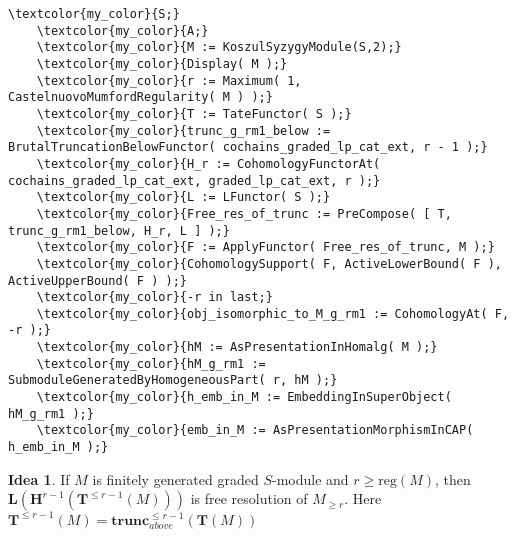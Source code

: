 \documentclass[16pt,a4paper]{extarticle}
\theoremstyle{definition}
\newtheorem{idea}{Idea}
\theoremstyle{theorem}
\newcommand{\LL}{\mathbf{L}}
\newcommand{\HH}{\mathbf{H}}
\newcommand{\TT}{\mathbf{T}}
\newcommand{\trunc}{\mathbf{trunc}}
\begin{document}
\begin{Verbatim}[commandchars=\\\{\}, fontseries=b, frame=single, label=Gap Code, framerule=0.5mm, rulecolor=\color{rule_color}]
    \textcolor{my_color}{S;}
    \textcolor{my_color}{A;}
    \textcolor{my_color}{M := KoszulSyzygyModule(S,2);}
    \textcolor{my_color}{Display( M );}
    \textcolor{my_color}{r := Maximum( 1, CastelnuovoMumfordRegularity( M ) );}
    \textcolor{my_color}{T := TateFunctor( S );}
    \textcolor{my_color}{trunc_g_rm1_below := BrutalTruncationBelowFunctor( cochains_graded_lp_cat_ext, r - 1 );}
    \textcolor{my_color}{H_r := CohomologyFunctorAt( cochains_graded_lp_cat_ext, graded_lp_cat_ext, r );}
    \textcolor{my_color}{L := LFunctor( S );}
    \textcolor{my_color}{Free_res_of_trunc := PreCompose( [ T, trunc_g_rm1_below, H_r, L ] );}
    \textcolor{my_color}{F := ApplyFunctor( Free_res_of_trunc, M );}
    \textcolor{my_color}{CohomologySupport( F, ActiveLowerBound( F ), ActiveUpperBound( F ) );}
    \textcolor{my_color}{-r in last;}
    \textcolor{my_color}{obj_isomorphic_to_M_g_rm1 := CohomologyAt( F, -r );}
    \textcolor{my_color}{hM := AsPresentationInHomalg( M );}
    \textcolor{my_color}{hM_g_rm1 := SubmoduleGeneratedByHomogeneousPart( r, hM );}
    \textcolor{my_color}{h_emb_in_M := EmbeddingInSuperObject( hM_g_rm1 );}
    \textcolor{my_color}{emb_in_M := AsPresentationMorphismInCAP( h_emb_in_M );}
    \end{Verbatim}
    \begin{idea}
        If $M$ is finitely generated graded $S$-module and $r\geq\mathrm{reg}(M)$, then $\LL(\HH^{r-1}( \TT^{\leq r-1}(M)) )$ is free resolution of $M_{\geq r}$.
        Here $\TT^{\leq r-1}(M) = \trunc^{\leq r-1}_{above}(\TT(M))$
    \end{idea}
\end{document}
